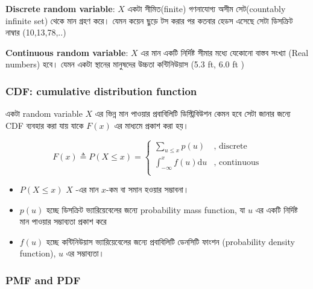 \documentclass[graybox, envcountchap, twocolumn]{styles/svmult}
\begin{document}
{%

\textbf{Discrete random variable}: $X$ একটা সীমিত(finite) গণনাযোগ্য অসীম সেট(countably infinite set) থেকে মান গ্রহণ করে। যেমন কয়েন ছুড়ে টস করার পর কতবার হেডস এসেছে সেটা ডিসক্রিট নাম্বার (10,13,78,..)

\textbf{Continuous random variable}:  $X$ এর মান একটি নির্দিষ্ট সীমার মধ্যে যেকোনো বাস্তব সংখ্যা (Real numbers) হবে। যেমন একটা স্থানের মানুষদের উচ্চতা কন্টিনিউয়াস (5.3 ft, 6.0 ft )


\subsubsection{CDF: cumulative distribution function}
একটা random variable $X$ এর ভিন্ন মান পাওয়ার প্রবাবিলিটি ডিস্ট্রিবিউশন কেমন হবে সেটা জানার জন্যে CDF ব্যবহার করা যায় যাকে $𝐹(𝑥)$ এর মাধ্যমে প্রকাশ করা হয়। 
}

\begin{equation}
F(x) \triangleq P(X \leq x)=\begin{cases}
\sum_{u \leq x}p(u) & \text{, discrete}\\
\int_{-\infty}^{x} f(u)\mathrm{d}u & \text{, continuous}\\
\end{cases}
\end{equation}
\bengalifont
\begin{itemize}
    \item $  P(X \leq x) $ $X$ -{\bengalifont এর মান} $x$-{ কম বা সমান হওয়ার সম্ভাবনা।}
    \item $p(u)$ {\bengalifont হচ্ছে ডিসক্রিট ভ্যারিয়েবেলের জন্যে probability mass function, যা $u$ এর একটি নির্দিষ্ট মান পাওয়ার সম্ভাব্যতা প্রকাশ করে }
    \item $ f(u)$ {\bengalifont হচ্ছে কন্টিনিউয়াস ভ্যারিয়েবেলের জন্যে প্রবাবিলিটি ডেনসিটি ফাংশন (probability density function), $u$ এর সম্ভাব্যতা। } 
\end{itemize}


\bengalifont
\subsubsection{PMF and PDF}
\end{document}
